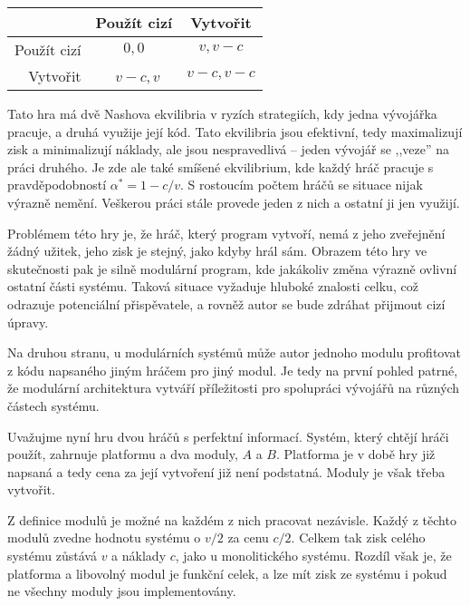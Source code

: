 \begin{multicols}{2}
		\begin{Figure}
		\begin{center}
		\begin{tabular}{r| c c}
				& Použít cizí & Vytvořit \\
				\hline
			Použít cizí & $0,0$ &\cellcolor{gray!25} $v, v-c$ \\
			Vytvořit &\cellcolor{gray!25} $v-c, v$ & $v-c, v-c$ \\
		\end{tabular}
		\end{center}
		\label{tab:involuntary-altruism-nf}
		\end{Figure}

		Tato hra má dvě Nashova ekvilibria v ryzích strategiích, kdy jedna vývojářka pracuje, a druhá využije její kód. Tato ekvilibria jsou efektivní, tedy maximalizují zisk a minimalizují náklady, ale jsou nespravedlivá -- jeden vývojář se ,,veze'' na práci druhého. Je zde ale také smíšené ekvilibrium, kde  každý hráč pracuje s pravděpodobností $\alpha^* = 1-c/v$. S rostoucím počtem hráčů se situace nijak výrazně nemění. Veškerou práci stále provede jeden z nich a ostatní ji jen využijí.

		Problémem této hry je, že hráč, který program vytvoří, nemá z jeho zveřejnění žádný užitek, jeho zisk je stejný, jako kdyby hrál sám. Obrazem této hry ve skutečnosti pak je silně modulární program, kde jakákoliv změna výrazně ovlivní ostatní části systému. Taková situace vyžaduje hluboké znalosti celku, což odrazuje potenciální přispěvatele, a rovněž autor se bude zdráhat přijmout cizí úpravy.

		Na druhou stranu, u modulárních systémů může autor jednoho modulu profitovat z kódu napsaného jiným hráčem pro jiný modul. Je tedy na první pohled patrné, že modulární architektura vytváří příležitosti pro spolupráci vývojářů na různých částech systému.

		Uvažujme nyní hru dvou hráčů s perfektní informací. Systém, který chtějí hráči použít, zahrnuje platformu a dva moduly, $A$ a $B$. Platforma je v době hry již napsaná a tedy cena za její vytvoření již není podstatná. Moduly je však třeba vytvořit.

		Z definice modulů je možné na každém z nich pracovat nezávisle. Každý z těchto modulů zvedne hodnotu systému o $v/2$ za cenu $c/2$. Celkem tak zisk celého systému zůstává $v$ a náklady $c$, jako u monolitického systému. Rozdíl však je, že platforma a libovolný modul je funkční celek, a lze mít zisk ze systému i pokud ne všechny moduly jsou implementovány.


\end{multicols}
